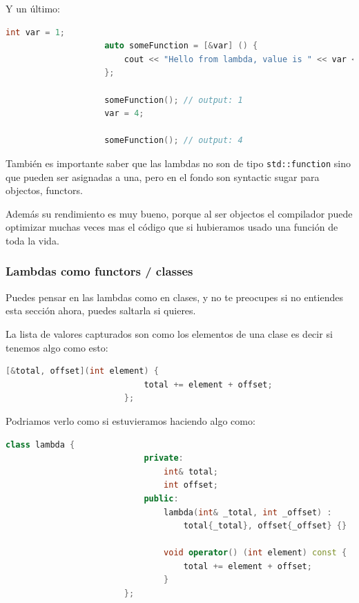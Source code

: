 \documentclass[12pt, fleqn]{report}                             %
\theoremstyle{break}                                            %
\newcommand{\textCode}[1]  { \texttt{#1} }                      %
\begin{document}
                Y un último:
                \begin{lstlisting}[language=C++, gobble=20]
                    int var = 1;
                    auto someFunction = [&var] () { 
                        cout << "Hello from lambda, value is " << var << '\n';
                    };

                    someFunction(); // output: 1
                    var = 4;

                    someFunction(); // output: 4
                \end{lstlisting}

                También es importante saber que las lambdas no son de tipo \textCode{std::function}
                sino que pueden ser asignadas a una, pero en el fondo son syntactic sugar para objectos,
                functors.

                Además su rendimiento es muy bueno, porque al ser objectos el compilador puede optimizar
                muchas veces mas el código que si hubieramos usado una función de toda la vida.


                \subsubsection{Lambdas como functors / classes}
                
                    Puedes pensar en las lambdas como en clases, y no te preocupes si no entiendes
                    esta sección ahora, puedes saltarla si quieres.

                    La lista de valores capturados son como los elementos de una clase
                    es decir si tenemos algo como esto:

                    \begin{lstlisting}[language=C++, gobble=24]
                        [&total, offset](int element) { 
                            total += element + offset;
                        };
                    \end{lstlisting}

                    Podriamos verlo como si estuvieramos haciendo algo como:
                    \begin{lstlisting}[language=C++, gobble=24]
                        class lambda {
                            private:
                                int& total;
                                int offset;
                            public: 
                                lambda(int& _total, int _offset) : 
                                    total{_total}, offset{_offset} {}

                                void operator() (int element) const { 
                                    total += element + offset;
                                }
                        };
                    \end{lstlisting}
\end{document}
